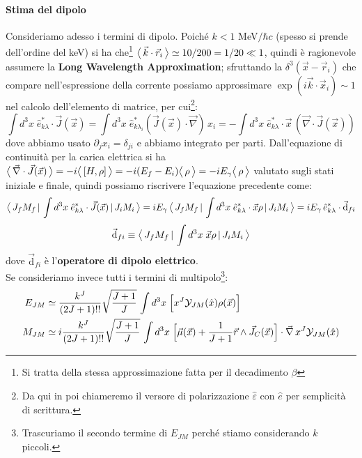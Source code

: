 \paragraph{Stima del dipolo} Consideriamo adesso i termini di dipolo. Poiché $k< 1$ MeV$/\hbar c$ (spesso si prende dell'ordine del keV) si ha che\footnote{Si tratta della stessa approssimazione fatta per il decadimento $\beta$} $\bigl\langle\, \vec{k}\cdot\vec{r}_i\, \bigr\rangle\simeq 10/200 = 1/20\ll 1$, quindi è ragionevole assumere la \textbf{Long Wavelength Approximation}; sfruttando la $\delta^3(\vec{x}-\vec{r}_i)$ che compare nell'espressione della corrente possiamo approssimare $\exp{(i\vec{k}\cdot\vec{x}_i)}\sim 1$ nel calcolo dell'elemento di matrice, per cui\footnote{Da qui in poi chiameremo il versore di polarizzazione $\widehat{\varepsilon}$ con $\hat{e}$ per semplicità di scrittura.}:
$$\int d^3x\; \hat{e}_{k\lambda}^* \cdot \vec{J}(\vec{x}) = \int d^3x\; \hat{e}_{k\lambda_i}^*  (\vec{J}(\vec{x})\cdot \vec{\nabla})\,x_i = - \int d^3x \; \hat{e}_{k\lambda}^* \cdot \vec{x}\, (\vec{\nabla}\cdot\vec{J}(\vec{x})) $$
dove abbiamo usato $\partial_j x_i = \delta_{ji}$ e abbiamo integrato per parti. Dall'equazione di continuità per la carica elettrica si ha $\bigl\langle\, \vec{\nabla}\cdot\vec{J}(\vec{x})\, \bigr\rangle = -i\bigl\langle\, [H,\rho]\, \bigr\rangle = -i(E_f-E_i)\bigl\langle\, \rho\, \bigr\rangle = -i E_\gamma \bigl\langle\, \rho\, \bigr\rangle$  valutato sugli stati iniziale e finale, quindi possiamo riscrivere l'equazione precedente come:
$$\bigl\langle\, J_fM_f\, |\,\int d^3x \; \hat{e}^*_{k\lambda}\cdot \vec{J}(\vec{x})\, |\,J_iM_i\, \bigr\rangle = iE_\gamma \, \bigl\langle\, J_fM_f\, |\,\int d^3x \; \hat{e}^*_{k\lambda}\cdot \vec{x}\rho\, |\,J_iM_i\, \bigr\rangle = i E_\gamma \, \hat{e}^*_{k\lambda} \cdot \vec{\mathrm{d}}_{fi}$$
$$\vec{\mathrm{d}}_{fi} \equiv \bigl\langle\, J_fM_f\, |\,\int d^3x \; \vec{x}\rho\, |\,J_iM_i\, \bigr\rangle$$
dove $\vec{\mathrm{d}}_{fi}$ è l'\textbf{operatore di dipolo elettrico}.\\
Se consideriamo invece tutti i termini di multipolo\footnote{Trascuriamo il secondo termine di $E_{JM}$ perché stiamo considerando $k$ piccoli.}:
\begin{displaymath}
\begin{aligned}
E_{JM} &\simeq \frac{k^J}{(2J+1)!!} \sqrt{\frac{J+1}{J}}\, \int d^3x \; \Bigl [ x^J \mathcal{Y}_{JM}(\hat{x})\rho(\vec{x}) \Bigr ] \\
M_{JM} &\simeq i\frac{k^J}{(2J+1)!!} \sqrt{\frac{J+1}{J}}\, \int d^3x \; \Bigl [ \vec{\mu}(\vec{x}) + \frac{1}{J+1} \vec{r}\land \vec{J}_C(\vec{x}) \Bigr ]\cdot \vec{\nabla}\,x^J\mathcal{Y}_{JM}(\hat{x})
\end{aligned}
\end{displaymath}
